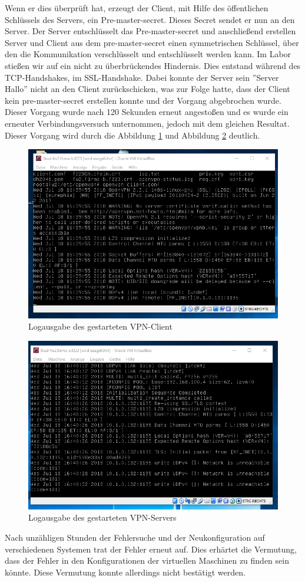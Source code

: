 Wenn er dies überprüft hat, erzeugt der Client, mit Hilfe des öffentlichen Schlüssels des Servers, ein Pre-master-secret. Dieses Secret sendet er nun an den Server. Der Server entschlüsselt das Pre-master-secret und anschließend erstellen Server und Client aus dem pre-master-secret einen symmetrischen Schlüssel, über den die Kommunikation verschlüsselt und entschlüsselt werden kann.\newline
Im Labor stießen wir auf ein nicht zu überbrückendes Hindernis. Dies entstand während des TCP-Handshakes, im SSL-Handshake. Dabei konnte der Server sein ''Server Hallo'' nicht an den Client zurückschicken, was zur Folge hatte, dass der Client kein pre-master-secret erstellen konnte und der Vorgang abgebrochen wurde. Dieser Vorgang wurde nach 120 Sekunden erneut angestoßen und es wurde ein erneuter Verbindungsversuch unternommen, jedoch mit dem gleichen Resultat. Dieser Vorgang wird durch die Abbildung \ref{fig:logClient} und Abbildung \ref{fig:logServer} deutlich. 
\begin{figure}[h]
	\includegraphics[width=\textwidth]{pictures/clientlog.png}
	\caption{Logausgabe des gestarteten VPN-Client}
	\label{fig:logClient}
\end{figure}
\begin{figure}[h]
	\includegraphics[width=\textwidth]{pictures/Serverlog.png}
	\caption{Logausgabe des gestarteten VPN-Servers}
	\label{fig:logServer}
\end{figure}
Nach unzähligen Stunden der Fehlersuche und der Neukonfiguration auf verschiedenen Systemen trat der Fehler erneut auf. Dies erhärtet die Vermutung, dass der Fehler in den Konfigurationen der virtuellen Maschinen zu finden sein könnte. Diese Vermutung konnte allerdings nicht bestätigt werden.  